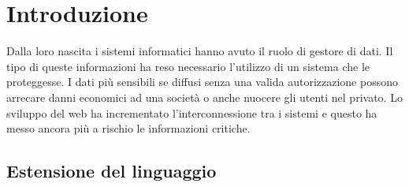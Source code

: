 \chapter{Introduzione}
Dalla loro nascita i sistemi informatici hanno avuto il ruolo di gestore di dati.
Il tipo di queste informazioni ha reso necessario l'utilizzo di un sistema che le proteggesse. I dati più sensibili se diffusi
senza una valida autorizzazione possono arrecare danni economici ad una società o anche nuocere gli utenti nel privato.
Lo sviluppo del web ha incrementato l'interconnessione tra i sistemi e questo ha messo ancora più a rischio le
informazioni critiche.\\\par 

\section{Estensione del linguaggio}
\label{sec:Estensione del linguaggio}
